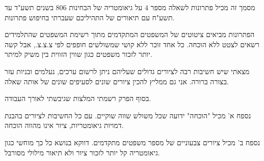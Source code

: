 מסמך זה מכיל פתרונות לשאלה מספר 
$4$
על גיאומטריה של הבחינות 
$806$
בשנים תשע"ד עד תשע"ח עם תיאורים של התהיליכם שעברתי בחיפוש פתרונות.

הפתרונות מביאים ציטוטים של המשפטים המתקדמים מתוך רשימת המשפטים שהתלמידים רשאים לצטט ללא הוכחה. כל אחד זוכר ללא קושי שמשולשים חופפים לפי צ.צ.צ., אבל קשה יותר לזכור משפטים כגון שווין הזווית בין משיק למיתר.

מצאתי שיש חשיבות רבה לציורים גדולים שעליהם ניתן לרשום ערכים, נעלמים ובניות עזר בצורה ברורה. אני גם ממליץ להכין ציורים שונים לסעיפים שונים של אותה שאלה.

בסוף הפרק רשמתי המלצות שגיבשתי לאורך העבודה.

נספח א' מכיל "הוכחה" ידועה שכל משולש שווה שוקיים. עם כל החשיבות לציורים בהבנת דמויות גיאומטריות, ציור אינו מהווה הוכחה.

נספח ב' מכיל ציורים צבעוניים של מספר משפטים מתקדמים. דווקא בנושא כל כך מוחשי כגון גיאומטריה קל יותר לזכור ציור ולא תיאור מילולי מסורבל.

\np
\mbox{}
\np